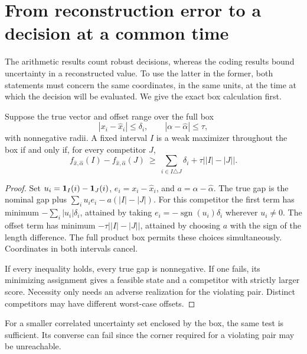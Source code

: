 \section{From reconstruction error to a decision at a common time}\label{sec:bridge}
The arithmetic results count robust decisions, whereas the coding results bound uncertainty in a reconstructed value. To use the latter in the former, both statements must concern the same coordinates, in the same units, at the time at which the decision will be evaluated. We give the exact box calculation first.

\begin{theorem}\label{thm:heterogeneous}
Suppose the true vector and offset range over the full box
\[
|x_i-\widehat x_i|\le\delta_i,\qquad |\alpha-\widehat\alpha|\le\tau,
\]
with nonnegative radii. A fixed interval $I$ is a weak maximizer throughout the box if and only if, for every competitor $J$,
\begin{equation}\label{eq:jointbridge}
 f_{\widehat x,\widehat\alpha}(I)-f_{\widehat x,\widehat\alpha}(J)
 \ \ge\ \sum_{i\in I\triangle J}\delta_i+\tau\big||I|-|J|\big|.
\end{equation}
\end{theorem}
\begin{proof}
Set $u_i=\mathbf 1_I(i)-\mathbf 1_J(i)$, $e_i=x_i-\widehat x_i$, and $a=\alpha-\widehat\alpha$. The true gap is the nominal gap plus $\sum_i u_i e_i-a(|I|-|J|)$. For this competitor the first term has minimum $-\sum_i |u_i|\delta_i$, attained by taking $e_i=-\operatorname{sgn}(u_i)\delta_i$ wherever $u_i\ne0$. The offset term has minimum $-\tau\big||I|-|J|\big|$, attained by choosing $a$ with the sign of the length difference. The full product box permits these choices simultaneously. Coordinates in both intervals cancel.

If every inequality holds, every true gap is nonnegative. If one fails, its minimizing assignment gives a feasible state and a competitor with strictly larger score. Necessity only needs an adverse realization for the violating pair. Distinct competitors may have different worst-case offsets.
\end{proof}
For a smaller correlated uncertainty set enclosed by the box, the same test is sufficient. Its converse can fail since the corner required for a violating pair may be unreachable.

